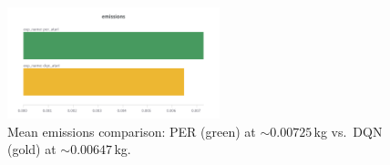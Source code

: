 \begin{figure}
	\centering
	\includegraphics[width=0.55\textwidth]{figures/per/emissions_dqn_per.png}
	\caption{Mean emissions comparison: PER (green) at $\sim0.00725$\,kg vs.\ DQN (gold) at $\sim0.00647$\,kg.}
	\label{fig:per_vs_dqn_emissions}
\end{figure}

\begin{table}
	\caption{Overall final evaluation (10 episodes each) for PER across 32 runs.}
	\label{tab:per_eval_overall}
	\centering
\end{table}

